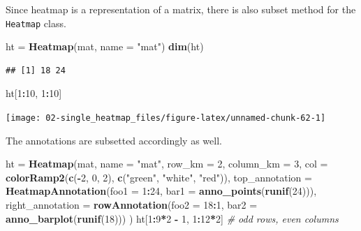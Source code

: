 \documentclass[]{book}
\newenvironment{Shaded}{\begin{snugshade}}{\end{snugshade}}
\newcommand{\KeywordTok}[1]{\textcolor[rgb]{0.13,0.29,0.53}{\textbf{#1}}}
\newcommand{\DataTypeTok}[1]{\textcolor[rgb]{0.13,0.29,0.53}{#1}}
\newcommand{\DecValTok}[1]{\textcolor[rgb]{0.00,0.00,0.81}{#1}}
\newcommand{\StringTok}[1]{\textcolor[rgb]{0.31,0.60,0.02}{#1}}
\newcommand{\CommentTok}[1]{\textcolor[rgb]{0.56,0.35,0.01}{\textit{#1}}}
\newcommand{\OperatorTok}[1]{\textcolor[rgb]{0.81,0.36,0.00}{\textbf{#1}}}
\newcommand{\NormalTok}[1]{#1}
\theoremstyle{definition}
\theoremstyle{definition}
\theoremstyle{definition}
\theoremstyle{remark}
\begin{document}
Since heatmap is a representation of a matrix, there is also subset
method for the \texttt{Heatmap} class.

\begin{Shaded}
\begin{Highlighting}[]
\NormalTok{ht =}\StringTok{ }\KeywordTok{Heatmap}\NormalTok{(mat, }\DataTypeTok{name =} \StringTok{"mat"}\NormalTok{)}
\KeywordTok{dim}\NormalTok{(ht)}
\end{Highlighting}
\end{Shaded}

\begin{verbatim}
## [1] 18 24
\end{verbatim}

\begin{Shaded}
\begin{Highlighting}[]
\NormalTok{ht[}\DecValTok{1}\OperatorTok{:}\DecValTok{10}\NormalTok{, }\DecValTok{1}\OperatorTok{:}\DecValTok{10}\NormalTok{]}
\end{Highlighting}
\end{Shaded}

\begin{center}\texttt{[image: 02-single\_heatmap\_files/figure-latex/unnamed-chunk-62-1]} \end{center}

The annotations are subsetted accordingly as well.

\begin{Shaded}
\begin{Highlighting}[]
\NormalTok{ht =}\StringTok{ }\KeywordTok{Heatmap}\NormalTok{(mat, }\DataTypeTok{name =} \StringTok{"mat"}\NormalTok{, }\DataTypeTok{row_km =} \DecValTok{2}\NormalTok{, }\DataTypeTok{column_km =} \DecValTok{3}\NormalTok{,}
    \DataTypeTok{col =} \KeywordTok{colorRamp2}\NormalTok{(}\KeywordTok{c}\NormalTok{(}\OperatorTok{-}\DecValTok{2}\NormalTok{, }\DecValTok{0}\NormalTok{, }\DecValTok{2}\NormalTok{), }\KeywordTok{c}\NormalTok{(}\StringTok{"green"}\NormalTok{, }\StringTok{"white"}\NormalTok{, }\StringTok{"red"}\NormalTok{)),}
    \DataTypeTok{top_annotation =} \KeywordTok{HeatmapAnnotation}\NormalTok{(}\DataTypeTok{foo1 =} \DecValTok{1}\OperatorTok{:}\DecValTok{24}\NormalTok{, }\DataTypeTok{bar1 =} \KeywordTok{anno_points}\NormalTok{(}\KeywordTok{runif}\NormalTok{(}\DecValTok{24}\NormalTok{))),}
    \DataTypeTok{right_annotation =} \KeywordTok{rowAnnotation}\NormalTok{(}\DataTypeTok{foo2 =} \DecValTok{18}\OperatorTok{:}\DecValTok{1}\NormalTok{, }\DataTypeTok{bar2 =} \KeywordTok{anno_barplot}\NormalTok{(}\KeywordTok{runif}\NormalTok{(}\DecValTok{18}\NormalTok{)))}
\NormalTok{)}
\NormalTok{ht[}\DecValTok{1}\OperatorTok{:}\DecValTok{9}\OperatorTok{*}\DecValTok{2} \OperatorTok{-}\StringTok{ }\DecValTok{1}\NormalTok{, }\DecValTok{1}\OperatorTok{:}\DecValTok{12}\OperatorTok{*}\DecValTok{2}\NormalTok{] }\CommentTok{# odd rows, even columns}
\end{Highlighting}
\end{Shaded}
\end{document}
